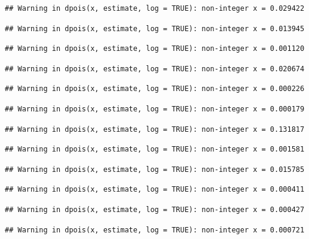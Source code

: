 \documentclass[]{article}
\begin{document}
\begin{verbatim}
## Warning in dpois(x, estimate, log = TRUE): non-integer x = 0.029422
\end{verbatim}

\begin{verbatim}
## Warning in dpois(x, estimate, log = TRUE): non-integer x = 0.013945
\end{verbatim}

\begin{verbatim}
## Warning in dpois(x, estimate, log = TRUE): non-integer x = 0.001120
\end{verbatim}

\begin{verbatim}
## Warning in dpois(x, estimate, log = TRUE): non-integer x = 0.020674
\end{verbatim}

\begin{verbatim}
## Warning in dpois(x, estimate, log = TRUE): non-integer x = 0.000226
\end{verbatim}

\begin{verbatim}
## Warning in dpois(x, estimate, log = TRUE): non-integer x = 0.000179
\end{verbatim}

\begin{verbatim}
## Warning in dpois(x, estimate, log = TRUE): non-integer x = 0.131817
\end{verbatim}

\begin{verbatim}
## Warning in dpois(x, estimate, log = TRUE): non-integer x = 0.001581
\end{verbatim}

\begin{verbatim}
## Warning in dpois(x, estimate, log = TRUE): non-integer x = 0.015785
\end{verbatim}

\begin{verbatim}
## Warning in dpois(x, estimate, log = TRUE): non-integer x = 0.000411
\end{verbatim}

\begin{verbatim}
## Warning in dpois(x, estimate, log = TRUE): non-integer x = 0.000427
\end{verbatim}

\begin{verbatim}
## Warning in dpois(x, estimate, log = TRUE): non-integer x = 0.000721
\end{verbatim}
\end{document}
